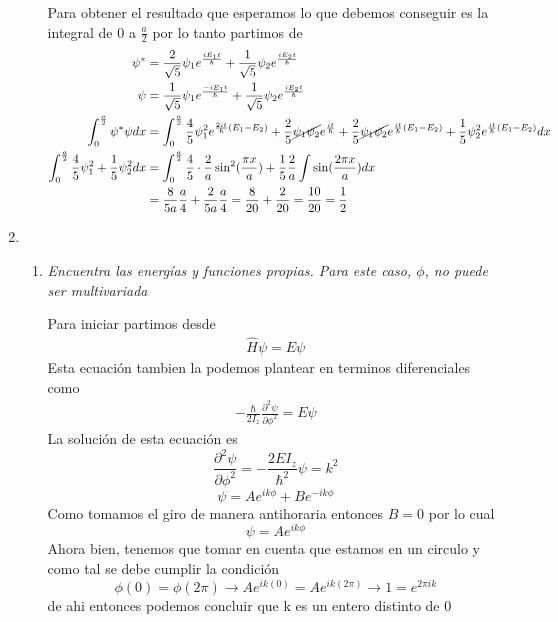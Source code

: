 \documentclass[12pt]{exam}
\begin{document}
\begin{enumerate}
\begin{enumerate}
				Para obtener el resultado que esperamos lo que debemos conseguir es la integral de $0$ a $\frac{a}{2}$ por lo tanto partimos de
				\begin{align*}
				  \psi^{*}&= \frac{2}{\sqrt{5}}\psi_{1}e^{\frac{iE_{1}t}{\hbar}}+\frac{1}{\sqrt{5}}\psi_{2}e^{\frac{iE_{2}t}{\hbar}}\\
				  \psi &= \frac{1}{\sqrt{5}}\psi_{1}e^{\frac{-iE_{1}t}{\hbar}}+\frac{1}{\sqrt{5}}\psi_{2}e^{\frac{iE_{2}t}{\hbar}}\\
				  \int_{0}^{\frac{a}{2}}\psi^{*}\psi dx &= \int_{0}^{\frac{a}{2}}\frac{4}{5}\psi_{1}^{2}e^{\frac{2it}{\hbar}(E_{1}-E_{2})}+\frac{2}{5}\cancel{\psi_{1}\psi_{2}}e^{\frac{it}{\hbar}}+\frac{2}{5}\cancel{\psi_{1}\psi_{2}}e^{\frac{it}{\hbar}(E_{1}-E_{2})}+\frac{1}{5}\psi_{2}^{2}e^{\frac{it}{\hbar}(E_{1}-E_{2})}dx\\
				  \int_{0}^{\frac{a}{2}}\frac{4}{5}\psi_{1}^{2}+\frac{1}{5}\psi^{2}_{2}dx &= \int_{0}^{\frac{a}{2}}\frac{4}{5}\cdot\frac{2}{a}\sin^{2}(\frac{\pi x}{a})+\frac{1}{5}\frac{2}{a}\int\sin(\frac{2\pi x}{a})dx\\
				  &= \frac{8}{5a}\frac{a}{4}+\frac{2}{5a}\frac{a}{4}=\frac{8}{20}+\frac{2}{20}=\frac{10}{20}=\frac{1}{2}
 				\end{align*}
		\end{enumerate}
  \item \begin{enumerate}
		  \item \textit{Encuentra las energías y funciones propias. Para este caso, $\phi$, no puede ser multivariada}

				Para iniciar partimos desde
				\begin{align*}
				  \hat{H}\psi=E\psi
				\end{align*}
				Esta ecuación tambien la podemos plantear en terminos diferenciales como
				\begin{align*}
				  -\frac{\hbar}{2I_{z}}\frac{\partial^{2}\psi}{\partial \phi^{2}} = E\psi
				\end{align*}
				La solución de esta ecuación es
				\[\frac{\partial^{2}\psi}{\partial \phi^{2}}=-\frac{2EI_{z}}{\hbar^{2}}\psi=k^{2}\]
				\[\psi = Ae^{ik\phi}+Be^{-ik\phi}\]
				Como tomamos el giro de manera antihoraria entonces $B=0$ por lo cual
				\[\psi = Ae^{ik\phi}\]
				Ahora bien, tenemos que tomar en cuenta que estamos en un circulo y como tal se debe cumplir la condición
				\[\phi(0)=\phi(2\pi)\rightarrow Ae^{ik(0)}=Ae^{ik(2\pi)}\rightarrow 1=e^{2\pi ik}\]
				de ahi entonces podemos concluir que k es un entero distinto de 0


\end{enumerate}
\end{enumerate}
\end{document}
